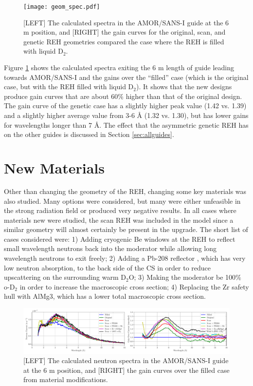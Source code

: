 \documentclass[a4paper]{jpconf}
\begin{document}
\begin{figure}[h!]
\begin{center}
\texttt{[image: geom\_spec.pdf]}
\end{center}
\caption{\label{spec_geom} [LEFT] The calculated spectra in the AMOR/SANS-I guide at the 6 m position, and [RIGHT] the gain curves for the original, scan, and genetic REH geometries compared the case where the REH is filled with liquid D$_2$.}
\end{figure}

Figure \ref{spec_geom} shows the calculated spectra exiting the 6 m length of guide leading towards AMOR/SANS-I and the gains over the ``filled'' case (which is the original case, but with the REH filled with liquid D$_2$).  It shows that the new designs produce gain curves that are about 60\% higher than that of the original design.  The gain curve of the genetic case has a slightly higher peak value (1.42 vs. 1.39) and a slightly higher average value from 3-6 {\AA} (1.32 vs. 1.30), but has lower gains for wavelengths longer than 7 {\AA}.  The effect that the asymmetric genetic REH has on the other guides is discussed in Section \ref{sec:allguides}.

\section{New Materials}

Other than changing the geometry of the REH, changing some key materials was also studied.  Many options were considered, but many were either unfeasible in the strong radiation field or produced very negative results.  In all cases where materials new were studied, the scan REH was included in the model since a similar geometry will almost certainly be present in the upgrade.  The short list of cases considered were: 1) Adding cryogenic Be windows at the REH \cite{Be} to reflect small wavelength neutrons back into the moderator while allowing long wavelength neutrons to exit freely; 2) Adding a Pb-208 reflector \cite{Pb208}, which has very low neutron absorption, to the back side of the CS in order to reduce upscattering on the surrounding warm D$_2$O;  3) Making the moderator be 100\% o-D$_2$ in order to increase the macroscopic cross section; 4) Replacing the Zr safety hull with AlMg3, which has a lower total macroscopic cross section.

\begin{figure}[h!]
\begin{center}
  \includegraphics*[width=\linewidth,trim={0cm 0.4cm 0cm 0.5cm},clip]{all_mat_mods.pdf}
\caption{\label{spec_material}[LEFT] The calculated neutron spectra in the AMOR/SANS-I guide at the 6 m position, and [RIGHT] the gain curves over the filled case from material modifications.}
\end{center}
\end{figure}
\end{document}
